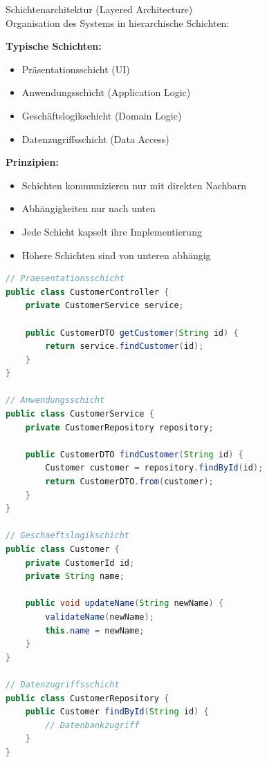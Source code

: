 \begin{concept}{Schichtenarchitektur (Layered Architecture)}\\
Organisation des Systems in hierarchische Schichten:

\textbf{Typische Schichten:}
\begin{itemize}
    \item Präsentationsschicht (UI)
    \item Anwendungsschicht (Application Logic)
    \item Geschäftslogikschicht (Domain Logic)
    \item Datenzugriffsschicht (Data Access)
\end{itemize}

\textbf{Prinzipien:}
\begin{itemize}
    \item Schichten kommunizieren nur mit direkten Nachbarn
    \item Abhängigkeiten nur nach unten
    \item Jede Schicht kapselt ihre Implementierung
    \item Höhere Schichten sind von unteren abhängig
\end{itemize}

\begin{lstlisting}[language=Java, style=basesmol]
// Praesentationsschicht
public class CustomerController {
    private CustomerService service;
    
    public CustomerDTO getCustomer(String id) {
        return service.findCustomer(id);
    }
}

// Anwendungsschicht
public class CustomerService {
    private CustomerRepository repository;
    
    public CustomerDTO findCustomer(String id) {
        Customer customer = repository.findById(id);
        return CustomerDTO.from(customer);
    }
}

// Geschaeftslogikschicht
public class Customer {
    private CustomerId id;
    private String name;
    
    public void updateName(String newName) {
        validateName(newName);
        this.name = newName;
    }
}

// Datenzugriffsschicht
public class CustomerRepository {
    public Customer findById(String id) {
        // Datenbankzugriff
    }
}
\end{lstlisting}
\end{concept}


